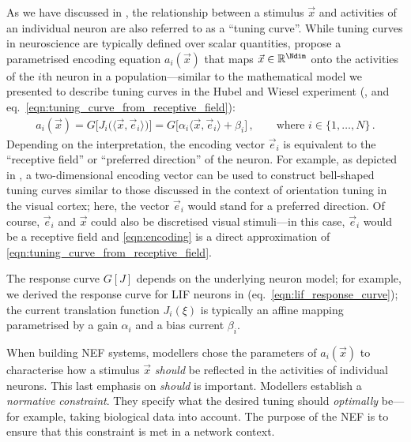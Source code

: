 As we have discussed in , the relationship between a stimulus $\vec x$ and activities of an individual neuron are also referred to as a \enquote{tuning curve}.
While tuning curves in neuroscience are typically defined over scalar quantities, \citeauthor{eliasmith2003neural} propose a parametrised encoding equation $a_i(\vec x)$ that maps $\vec x \in \mathbb{R}^{\Ndim}$ onto the activities of the $i$th neuron in a population---similar to the mathematical model we presented to describe tuning curves in the Hubel and Wiesel experiment (,   and eq.~\ref{eqn:tuning_curve_from_receptive_field}):
\begin{align}
a_i(\vec x) = G\big[J_i\big(\langle \vec x, \vec e_i \rangle\big)\big] = G\big[\alpha_i\langle \vec x, \vec e_i \rangle + \beta_i\big] \,,
 \quad\quad \text{where } i \in \{1, \ldots, N\} \,.\label{eqn:encoding}
\end{align}
Depending on the interpretation, the encoding vector $\vec e_i$ is equivalent to the \enquote{receptive field} or \enquote{preferred direction} of the neuron.
For example, as depicted in , a two-dimensional encoding vector can be used to construct bell-shaped tuning curves similar to those discussed in the context of orientation tuning in the visual cortex; here, the vector $\vec e_i$ would stand for a preferred direction.
Of course, $\vec e_i$ and $\vec x$ could also be discretised visual stimuli---in this case, $\vec e_i$ would be a receptive field and \cref{eqn:encoding} is a direct approximation of \cref{eqn:tuning_curve_from_receptive_field}.

The response curve $G[J]$ depends on the underlying neuron model; for example, we derived the response curve for LIF neurons in  (eq.~\ref{eqn:lif_response_curve}); 
the current translation function $J_i(\xi)$ is typically an affine mapping parametrised by a gain $\alpha_i$ and a bias current $\beta_i$.

When building NEF systems, modellers chose the parameters of $a_i(\vec x)$ to characterise how a stimulus $\vec x$ \emph{should} be reflected in the activities of individual neurons.
This last emphasis on \emph{should} is important.
Modellers establish a \emph{normative constraint}.
They specify what the desired tuning should \emph{optimally} be---for example, taking biological data into account.
The purpose of the NEF is to ensure that this constraint is met in a network context.


